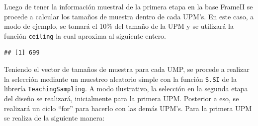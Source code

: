\documentclass[
  spanish,
  12pt,
]{book}
\newenvironment{Shaded}{\begin{snugshade}}{\end{snugshade}}
\newcommand{\AttributeTok}[1]{\textcolor[rgb]{0.13,0.29,0.53}{#1}}
\newcommand{\FloatTok}[1]{\textcolor[rgb]{0.00,0.00,0.81}{#1}}
\newcommand{\FunctionTok}[1]{\textcolor[rgb]{0.13,0.29,0.53}{\textbf{#1}}}
\newcommand{\NormalTok}[1]{#1}
\newcommand{\OtherTok}[1]{\textcolor[rgb]{0.56,0.35,0.01}{#1}}
\newcommand{\SpecialCharTok}[1]{\textcolor[rgb]{0.81,0.36,0.00}{\textbf{#1}}}
\begin{document}
Luego de tener la información muestral de la primera etapa en la base FrameII se procede a calcular los tamaños de muestra dentro de cada UPM's. En este caso, a modo de ejemplo, se tomará el 10\% del tamaño de la UPM y se utilizará la función \texttt{ceiling} la cual aproxima al siguiente entero.

\begin{Shaded}
\end{Shaded}

\begin{verbatim}
## [1] 699
\end{verbatim}

Teniendo el vector de tamaños de muestra para cada UMP, se procede a realizar la selección mediante un muestreo aleatorio simple con la función \texttt{S.SI} de la librería \texttt{TeachingSampling}. A modo ilustrativo, la selección en la segunda etapa del diseño se realizará, inicialmente para la primera UPM. Posterior a eso, se realizará un ciclo ``for'' para hacerlo con las demás UPM's. Para la primera UPM se realiza de la siguiente manera:
\end{document}
